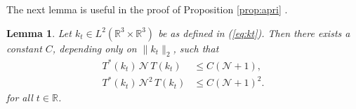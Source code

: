 \documentclass[11pt,a4paper]{article}
\newtheorem{cor}[thm]{Corollary}
\newtheorem{lemma}[thm]{Lemma}
\newtheorem*{rem}{Remark}
\newcommand{\bR}{{\mathbb R}}
\newcommand{\R}{\mathbb{R}}
\newcommand{\N}{\mathcal{N}}
\newcommand{\K}{\mathcal{K}}
\newcommand{\fock}{\mathcal{F}}		%
\newcommand{\Ncal}{\mathcal{N}}		%
\newcommand{\scal}[2]{\big<#1,#2\big>} %
\newcommand{\norm}[1]{\lVert#1\rVert}	%
\newcommand{\bd}{\begin{displaymath}}			%
\newcommand{\ed}{\end{displaymath}}
\begin{document}
The next lemma is useful in the proof of Proposition \ref{prop:apri} .
\begin{lemma} \label{lm:TNT}
Let $k_t \in L^2(\R^3 \times \R^3)$ be as defined in (\ref{eq:kt}). Then there exists a constant $C$, depending only on $\| k_t \|_2$, such that
\begin{align}
    T^* (k_t)  \, \N \, T (k_t) & \le C (\N+1), \label{eq:TNT} \\
    T^* (k_t) \, \N^2 \, T (k_t) & \le C (\N+1)^2. \label{eq:TN2T} %
  \end{align}
for all $t \in \bR$.
\end{lemma}



\end{document}
